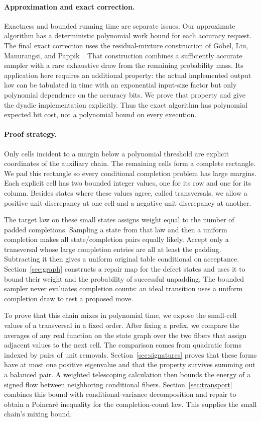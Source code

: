 \paragraph{Approximation and exact correction.}
Exactness and bounded running time are separate issues. Our approximate
algorithm has a deterministic polynomial work bound for each accuracy
request. The final exact correction uses the residual-mixture construction
of G\"obel, Liu, Manurangsi, and Pappik~\cite[Section~3.1, Algorithm~1 and
Theorem~6]{GLMP2024}. That construction combines a sufficiently accurate
sampler with a rare exhaustive draw from the remaining probability mass.
Its application here requires an additional property: the actual
implemented output law can be tabulated in time with an exponential
input-size factor but only polynomial dependence on the accuracy bits.
We prove that property and give the dyadic implementation explicitly.
Thus the exact algorithm has polynomial expected bit cost, not a
polynomial bound on every execution.

\paragraph{Proof strategy.}
Only cells incident to a margin below a polynomial threshold are explicit
coordinates of the auxiliary chain. The remaining cells form a complete
rectangle. We pad this rectangle so every conditional completion problem
has large margins. Each explicit cell has two bounded integer values,
one for its row and one for its column. Besides states where these values
agree, called transversals, we allow a positive unit discrepancy at one
cell and a negative unit discrepancy at another.

The target law on these small states assigns weight equal to the number
of padded completions. Sampling a state from that law and then a uniform
completion makes all state/completion pairs equally likely. Accept only
a transversal whose large completion entries are all at least the
padding. Subtracting it then gives a uniform original table conditional
on acceptance.
Section~\ref{sec:graph} constructs a repair map for the defect states and
uses it to bound their weight and the probability of successful unpadding.
The bounded sampler never evaluates completion counts: an ideal transition
uses a uniform completion draw to test a proposed move.

To prove that this chain mixes in polynomial time, we expose the small-cell
values of a transversal in a fixed order. After fixing a prefix, we compare
the averages of any real function on the state graph over the two fibers
that assign adjacent values to the next cell. The comparison comes from
quadratic forms indexed by pairs of unit removals.
Section~\ref{sec:signatures} proves that these forms have at most
one positive eigenvalue and that the property survives summing out a
balanced pair. A weighted telescoping calculation then bounds the energy
of a signed flow between neighboring conditional fibers.
Section~\ref{sec:transport} combines this bound with conditional-variance
decomposition and repair to obtain a Poincar\'e inequality for the
completion-count law. This supplies the small chain's mixing bound.


